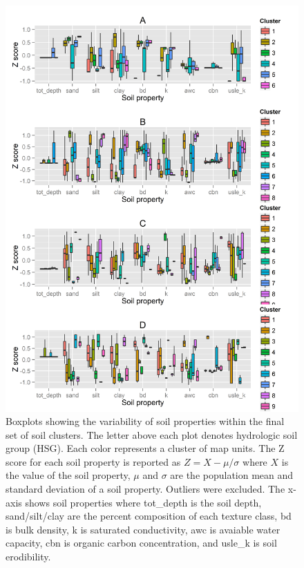 \begin{figure}[h!]
  \centering
    \includegraphics[width=\textwidth]{./img/cluster_variability.png}
	\caption[Boxplots showing the variability of soil properties]{Boxplots showing the variability of soil properties within the final set of soil clusters. The letter above each plot denotes hydrologic soil group (HSG). Each color represents a cluster of map units. The Z score for each soil property is reported as $Z = X - \mu / \sigma$ where $X$ is the value of the soil property, $\mu$ and $\sigma$ are the population mean and standard deviation of a soil property. Outliers were excluded. The x-axis shows soil properties where tot\_depth is the soil depth, sand/silt/clay are the percent composition of each texture class, bd is bulk density, k is saturated conductivity, awc is avaiable water capacity, cbn is organic carbon concentration, and usle\_k is soil erodibility.}
	\label{fig:soil_boxplots}
\end{figure}

